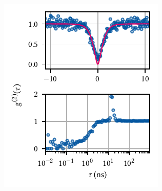 \begin{marginfigure}
    \centering
    \includegraphics{img/pdf/setup/ingaas_g2}
    \caption[]{
         measurement of the emission line at \qty{872.267}{\nano\meter} under \gls{cw} excitation with \qty{1}{\micro\watt} at \qty{793}{\nano\meter}.
        The monochromator bandwidth was $\Delta\lambda = \qty{200}{\pico\meter} = \qty{325}{\micro\eV}$.
    }
    \label{fig:setup:optics:ingaas:g2}
\end{marginfigure}

